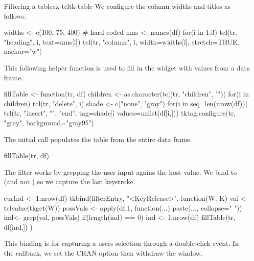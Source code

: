 \begin{example}{Filtering a table}{ex-tcltk-table}
We configure the column widths and titles as follows:
\begin{Schunk}
\begin{Sinput}
 widths <- c(100, 75, 400)            # hard coded
 nms <- names(df)
 for(i in 1:3) {
   tcl(tr, "heading", i, text=nms[i])
   tcl(tr, "column", i, width=widths[i], stretch=TRUE, anchor="w")
 }
\end{Sinput}
\end{Schunk}
This following helper function is used to fill in the widget with values from a data frame.
\begin{Schunk}
\begin{Sinput}
 fillTable <- function(tr, df) {
   children <- as.character(tcl(tr, "children", ""))
   for(i in children) tcl(tr, "delete", i)
   shade <- c("none", "gray")
   for(i in seq_len(nrow(df))) 
     tcl(tr, "insert", "", "end", tag=shade[i %
         values=unlist(df[i,]))
   tktag.configure(tr, "gray", background="gray95")
 }
\end{Sinput}
\end{Schunk}
The initial call populates the table from the entire data frame.
\begin{Schunk}
\begin{Sinput}
 fillTable(tr, df)
\end{Sinput}
\end{Schunk}

The filter works by grepping the user input agains the host value. We
bind to  (and not ) so we capture the last keystroke.
\begin{Schunk}
\begin{Sinput}
 curInd <- 1:nrow(df)
 tkbind(filterEntry, "<KeyRelease>", function(W, K) {
   val <- tclvalue(tkget(W))
   possVals <- apply(df,1, function(...) paste(..., collapse=" "))
   ind<- grep(val, possVals)
   if(length(ind) == 0) ind <- 1:nrow(df)
   fillTable(tr, df[ind,])
 })
\end{Sinput}
\end{Schunk}
This binding is for capturing a users selection through a double-click
event. In the callback, we set the CRAN option then withdraw the window.
\begin{Schunk}
\end{Schunk}
\end{example}


